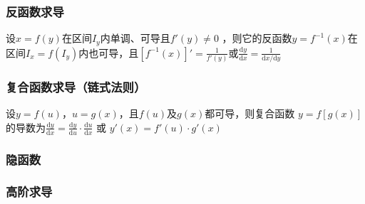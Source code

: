 \documentclass[12pt]{book}
\begin{document}
\subsubsection{反函数求导}

设$ x=f(y) $在区间$ I_y $内单调、可导且$ f'(y)\ne 0$ ，则它的反函数$ y=f^{-1}(x) $在区间$ I_x=f(I_y) $内也可导，且$ [f^{-1}(x)]'=\frac{1}{f'(y)} $或$ \frac{\mathrm{d}y}{\mathrm{d}{x}}=\frac{1}{\mathrm{d}x/\mathrm{d}y}$ 

\subsubsection{复合函数求导（链式法则）}

设$ y=f(u) $，$ u=g(x) $，且$ f(u) $及$ g(x) $都可导，则复合函数 $y=f[g(x)] $的导数为$ \frac{\mathrm{d}y}{\mathrm{d}x}=\frac{\mathrm{d}y}{\mathrm{d}u}\cdot \frac{\mathrm{d}u}{\mathrm{d}x} $ 或 $y'(x)=f'(u)\cdot g'(x) $

\subsubsection{隐函数}

\subsubsection{高阶求导}
\end{document}
